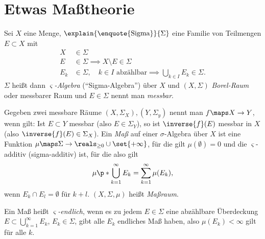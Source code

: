 \section{Etwas Maßtheorie}
\begin{definition}
  Sei \( X \) eine Menge, \( \explain{\text{\enquote{Sigma}}}{\Sigma} \) eine Familie von Teilmengen \( E\subset X \) mit
  \begin{align*}
    X&\in \Sigma\\
    E&\in \Sigma\implies X\setminus E \in \Sigma\\
    E_k&\in \Sigma,\quad k\in I \text{ abzählbar}\implies\bigcup_{k\in I}E_k\in \Sigma.
  \end{align*}
  \( \Sigma \) heißt dann \emph{\( \varsigma \)-Algebra} (\enquote{Sigma-Algebra}) über \( X \) und \( (X,\Sigma) \) \emph{Borel-Raum} oder messbarer Raum und \( E\in \Sigma \) nennt man \emph{messbar}.
  
  Gegeben zwei messbare Räume \( (X,\Sigma_X),(Y,\Sigma_y) \) nennt man \( f\maps X\to Y \), wenn gilt: Ist \( E\subset Y \) messbar (also \( E\in \Sigma_Y \)), so ist \( \inverse{f}(E) \) messbar in \( X \) (also \( \inverse{f}(E)\in \Sigma_X \)). Ein \emph{Maß } auf einer \( \sigma \)-Algebra über \( X \) ist eine Funktion \( \mu\maps \Sigma\to \reals_{\geq 0}\cup \set{+\infty} \), für die gilt \( \mu(\emptyset)=0 \) und die \( \varsigma \)-additiv (sigma-additiv) ist, für die also gilt
  \begin{equation*}
    \mu\p*{\bigcup_{k=1}^{\infty}E_k}=\sum\limits_{k=1}^{\infty}\mu(E_k),
  \end{equation*}
  wenn \( E_k\cap E_l =\emptyset \) für \( k+l \). \( (X,\Sigma,\mu) \)  heißt \emph{Maßraum}.
\end{definition}
Ein Maß heißt \emph{\( \varsigma \)-endlich}, wenn es zu jedem \( E\in \Sigma \) eine abzählbare Überdeckung \( E\subset \bigcup_{k=1}^\infty E_k \), \( E_k\in \Sigma \), gibt \sd alle \( E_k \) endliches Maß haben, also \( \mu(E_k)<\infty \) gilt für alle \( k \).

